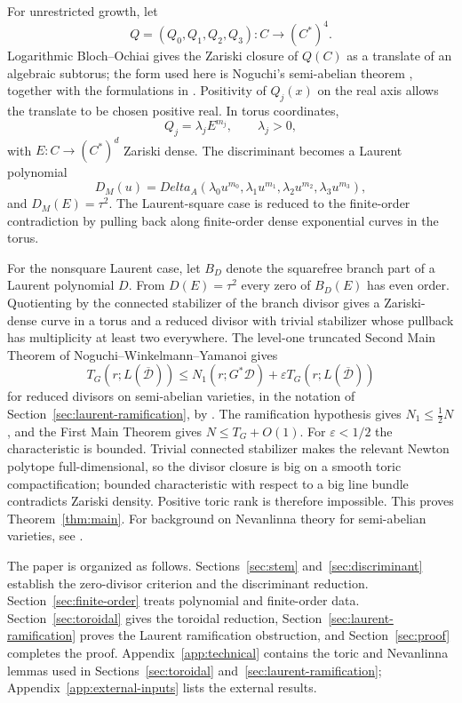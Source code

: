 \documentclass[11pt]{amsart}
\def\CC{C}%
\def\DeltaA{Delta_A}%
\numberwithin{equation}{section}
\theoremstyle{definition}
\theoremstyle{remark}
\newcommand{\CC}{\mathbb C}
\newcommand{\DeltaA}{\Delta_A}
\begin{document}
For unrestricted growth, let
\[
Q=(Q_0,Q_1,Q_2,Q_3):\CC\to(\CC^*)^4.
\]
Logarithmic Bloch--Ochiai gives the Zariski closure of $Q(\CC)$ as a translate of an algebraic subtorus; the form used here is Noguchi's semi-abelian theorem \cite[Main Theorem~(i)]{Noguchi1998HolomorphicCurves}, together with the formulations in \cite{NoguchiWinkelmannYamanoi2002SMT,DethloffLu2001LogarithmicJetBundles}.  Positivity of $Q_j(x)$ on the real axis allows the translate to be chosen positive real.  In torus coordinates,
\[
Q_j=\lambda_jE^{m_j},\qquad \lambda_j>0,
\]
with $E:\CC\to(\CC^*)^d$ Zariski dense.  The discriminant becomes a Laurent polynomial
\[
D_M(u)=\DeltaA(\lambda_0u^{m_0},\lambda_1u^{m_1},\lambda_2u^{m_2},\lambda_3u^{m_3}),
\]
and $D_M(E)=\tau^2$.  The Laurent-square case is reduced to the finite-order contradiction by pulling back along finite-order dense exponential curves in the torus.

For the nonsquare Laurent case, let $B_D$ denote the squarefree branch part of a Laurent polynomial $D$.  From $D(E)=\tau^2$ every zero of $B_D(E)$ has even order.  Quotienting by the connected stabilizer of the branch divisor gives a Zariski-dense curve in a torus and a reduced divisor with trivial stabilizer whose pullback has multiplicity at least two everywhere.  The level-one truncated Second Main Theorem of Noguchi--Winkelmann--Yamanoi gives
\[
T_G(r;L(\overline{\mathcal D}))\le N_1(r;G^*\mathcal D)+\varepsilon T_G(r;L(\overline{\mathcal D}))
\]
for reduced divisors on semi-abelian varieties, in the notation of Section~\ref{sec:laurent-ramification}, by \cite[Main Theorem~(iii)]{NoguchiWinkelmannYamanoi2008SMTII}.  The ramification hypothesis gives $N_1\le \frac12N$, and the First Main Theorem gives $N\le T_G+O(1)$.  For $\varepsilon<1/2$ the characteristic is bounded.  Trivial connected stabilizer makes the relevant Newton polytope full-dimensional, so the divisor closure is big on a smooth toric compactification; bounded characteristic with respect to a big line bundle contradicts Zariski density.  Positive toric rank is therefore impossible.  This proves Theorem~\ref{thm:main}.  For background on Nevanlinna theory for semi-abelian varieties, see \cite{GriffithsKing1973Nevanlinna,NoguchiWinkelmannYamanoi2007Degeneracy,NoguchiWinkelmann2014Nevanlinna,Noguchi1981LogDerivatives}.

The paper is organized as follows.  Sections~\ref{sec:stem} and~\ref{sec:discriminant} establish the zero-divisor criterion and the discriminant reduction.  Section~\ref{sec:finite-order} treats polynomial and finite-order data.  Section~\ref{sec:toroidal} gives the toroidal reduction, Section~\ref{sec:laurent-ramification} proves the Laurent ramification obstruction, and Section~\ref{sec:proof} completes the proof.  Appendix~\ref{app:technical} contains the toric and Nevanlinna lemmas used in Sections~\ref{sec:toroidal} and~\ref{sec:laurent-ramification}; Appendix~\ref{app:external-inputs} lists the external results.
\end{document}
